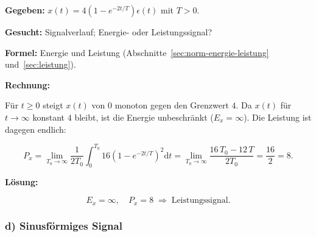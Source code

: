 \begin{beispiel}

\textbf{Gegeben:} $x(t) = 4\left(1 - e^{-2t/T}\right)\epsilon(t)$ mit $T > 0$.

\textbf{Gesucht:} Signalverlauf; Energie- oder Leistungssignal?

\textbf{Formel:} Energie und Leistung (Abschnitte~\ref{sec:norm-energie-leistung}
und~\ref{sec:leistung}).

\textbf{Rechnung:}

Für $t \geq 0$ steigt $x(t)$ von $0$ monoton gegen den Grenzwert $4$. Da $x(t)$
für $t \to \infty$ konstant $4$ bleibt, ist die Energie unbeschränkt
($E_x = \infty$). Die Leistung ist dagegen endlich:

$$
P_x = \lim_{T_0 \to \infty} \frac{1}{2T_0} \int_0^{T_0}
      16\left(1 - e^{-2t/T}\right)^2 \mathrm{d}t
    = \lim_{T_0 \to \infty} \frac{16\,T_0 - 12\,T}{2T_0}
    = \frac{16}{2} = 8.
$$

\begin{center}
\end{center}

\textbf{Lösung:}

$$
\boxed{\;E_x = \infty,\quad P_x = 8 \;\Rightarrow\; \text{Leistungssignal.}\;}
$$

\end{beispiel}

\subsubsection*{d) Sinusförmiges Signal}

